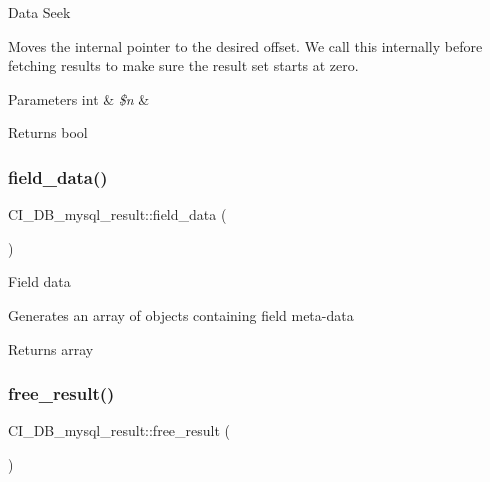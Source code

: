 Data Seek

Moves the internal pointer to the desired offset. We call this internally before fetching results to make sure the result set starts at zero.


\begin{DoxyParams}[1]{Parameters}
int & {\em \$n} & \\
\hline
\end{DoxyParams}
\begin{DoxyReturn}{Returns}
bool 
\end{DoxyReturn}
\mbox{\label{class_c_i___d_b__mysql__result_acaeac05e0290320845055aa3cd0874d5}} 
\subsubsection{\texorpdfstring{field\+\_\+data()}{field\_data()}}
{\footnotesize\ttfamily C\+I\+\_\+\+D\+B\+\_\+mysql\+\_\+result\+::field\+\_\+data (\begin{DoxyParamCaption}{ }\end{DoxyParamCaption})}

Field data

Generates an array of objects containing field meta-\/data

\begin{DoxyReturn}{Returns}
array 
\end{DoxyReturn}
\mbox{\label{class_c_i___d_b__mysql__result_ab71323a111af3a11d9e28241bf221687}} 
\subsubsection{\texorpdfstring{free\+\_\+result()}{free\_result()}}
{\footnotesize\ttfamily C\+I\+\_\+\+D\+B\+\_\+mysql\+\_\+result\+::free\+\_\+result (\begin{DoxyParamCaption}{ }\end{DoxyParamCaption})}

